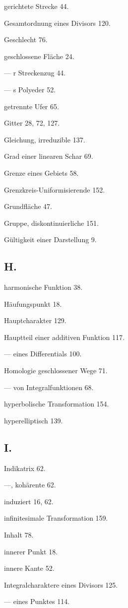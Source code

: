 \documentclass{article}
\begin{document}
gerichtete Strecke 44.

Gesamtordnung eines Divisors 120.

Geschlecht 76.

geschlossene Fläche 24.

--- r Streckenzug 44.

--- s Polyeder 52.

getrennte Ufer 65.

Gitter 28, 72, 127.

Gleichung, irreduzible 137.

Grad einer linearen Schar 69.

Grenze eines Gebiets 58.

Grenzkreis-Uniformisierende 152.

Grundfläche 47.

Gruppe, diskontinuierliche 151.

Gültigkeit einer Darstellung 9.

\subsection*{H.}

harmonische Funktion 38.

Häufungspunkt 18.

Hauptcharakter 129.

Hauptteil einer additiven Funktion 117.

--- eines Differentials 100.

Homologie geschlossener Wege 71.

--- von Integralfunktionen 68.

hyperbolische Transformation 154.

hyperelliptisch 139.

\subsection*{I.}

Indikatrix 62.

---, kohärente 62.

induziert 16, 62.

infinitesimale Transformation 159.

Inhalt 78.

innerer Punkt 18.

innere Kante 52.

Integralcharaktere eines Divisors 125.

--- eines Punktes 114.
\end{document}
